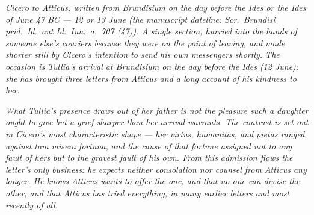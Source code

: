 
\textit{Cicero to Atticus, written from Brundisium on
the day before the Ides or the Ides of June 47 BC ---
12 or 13 June (the manuscript dateline: \textit{Scr.\
Brundisi prid.\ Id.\ aut Id.\ Iun.\ a.\ 707 (47)}). A
single section, hurried into the hands of someone
else's couriers because they were on the point of
leaving, and made shorter still by Cicero's intention
to send his own messengers shortly. The occasion is
Tullia's arrival at Brundisium on the day before the
Ides (12 June): she has brought three letters from
Atticus and a long account of his kindness to her.}

\textit{What Tullia's presence draws out of her father
is not the pleasure such a daughter ought to give but
a grief sharper than her arrival warrants. The contrast
is set out in Cicero's most characteristic shape ---
her \textit{virtus}, \textit{humanitas}, and
\textit{pietas} ranged against \textit{tam misera
fortuna}, and the cause of that fortune assigned not
to any fault of hers but to the gravest fault of his
own. From this admission flows the letter's only
business: he expects neither consolation nor counsel
from Atticus any longer. He knows Atticus wants to
offer the one, and that no one can devise the other,
and that Atticus has tried everything, in many earlier
letters and most recently of all.}
